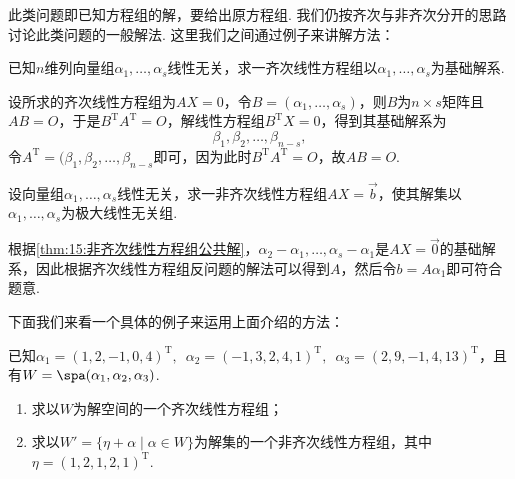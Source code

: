 此类问题即已知方程组的解，要给出原方程组. 我们仍按齐次与非齐次分开的思路讨论此类问题的一般解法. 这里我们之间通过例子来讲解方法：
\begin{example}
    已知$n$维列向量组$\alpha_1,\ldots,\alpha_s$线性无关，求一齐次线性方程组以$\alpha_1,\ldots,\alpha_s$为基础解系.
\end{example}

\begin{solution}
    设所求的齐次线性方程组为$AX=0$，令$B=(\alpha_1,\ldots,\alpha_s)$，则$B$为$n\times s$矩阵且$AB=O$，于是$B^\mathrm{T}A^\mathrm{T}=O$，解线性方程组$B^\mathrm{T}X=0$，得到其基础解系为
    \[\beta_1,\beta_2,\ldots,\beta_{n-s},\]
    令$A^\mathrm{T}=(\beta_1,\beta_2,\ldots,\beta_{n-s}$即可，因为此时$B^\mathrm{T}A^\mathrm{T}=O$，故$AB=O$.
\end{solution}

\begin{example}
    设向量组$\alpha_1,\ldots,\alpha_s$线性无关，求一非齐次线性方程组$AX=\vec{b}$，使其解集以$\alpha_1,\ldots,\alpha_s$为极大线性无关组.
\end{example}

\begin{solution}
    根据\autoref{thm:15:非齐次线性方程组公共解}，$\alpha_2-\alpha_1,\ldots,\alpha_s-\alpha_1$是$AX=\vec{0}$的基础解系，因此根据齐次线性方程组反问题的解法可以得到$A$，然后令$b=A\alpha_1$即可符合题意.
\end{solution}

下面我们来看一个具体的例子来运用上面介绍的方法：
\begin{example}
    已知$\alpha_1=(1,2,-1,0,4)^\mathrm{T},\enspace\alpha_2=(-1,3,2,4,1)^\mathrm{T},\enspace\alpha_3=(2,9,-1,4,13)^\mathrm{T}$，且有$W=\spa(\alpha_1,\alpha_2,\alpha_3)$.
    \begin{enumerate}
        \item 求以$W$为解空间的一个齐次线性方程组；

        \item 求以$W'=\{\eta+\alpha \mid \alpha\in W\}$为解集的一个非齐次线性方程组，其中$\eta=(1,2,1,2,1)^\mathrm{T}$.
    \end{enumerate}
\end{example}

